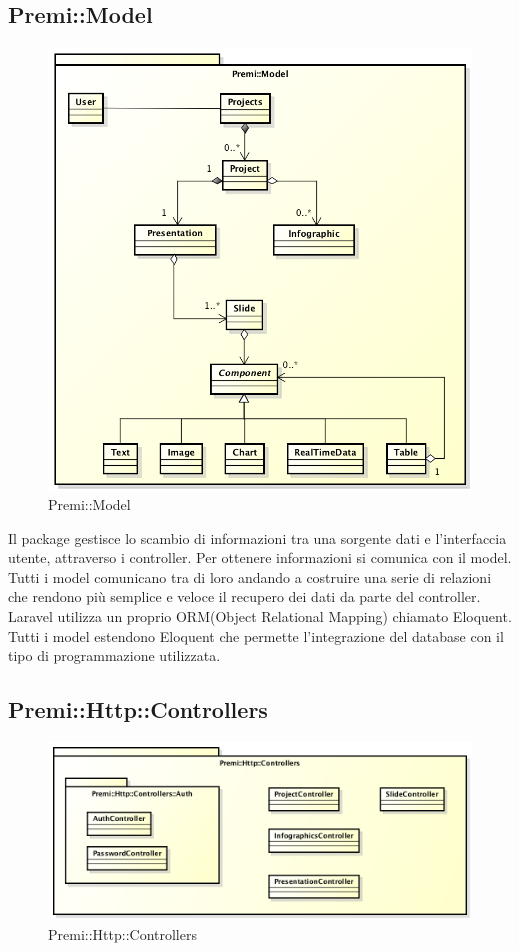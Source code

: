 \subsection{Premi::Model}
	\begin{figure}[h]
		\centering
		\includegraphics[width=0.7\linewidth]{img/premi_model}
		\caption[Premi::Model]{Premi::Model}
		\label{fig:back_end_premi_model}
	\end{figure}

	
Il package gestisce lo scambio di informazioni tra una sorgente dati e l'interfaccia utente, attraverso i controller. Per ottenere informazioni si comunica con il model. Tutti i model comunicano tra di loro andando a costruire una serie di relazioni che rendono più semplice e veloce il recupero dei dati da parte del controller. Laravel utilizza un proprio ORM(Object Relational Mapping) chiamato Eloquent. Tutti i model estendono Eloquent che permette l'integrazione del database con il tipo di programmazione utilizzata.

\newpage



\newpage
\subsection{Premi::Http::Controllers}
	\begin{figure}[h]
		\centering
		\includegraphics[width=0.7\linewidth]{img/back_end_premi_http_controllers}
		\caption[Premi::Http::Controllers]{Premi::Http::Controllers}
		\label{fig:back_end_premi_http_controllers}
	\end{figure}

